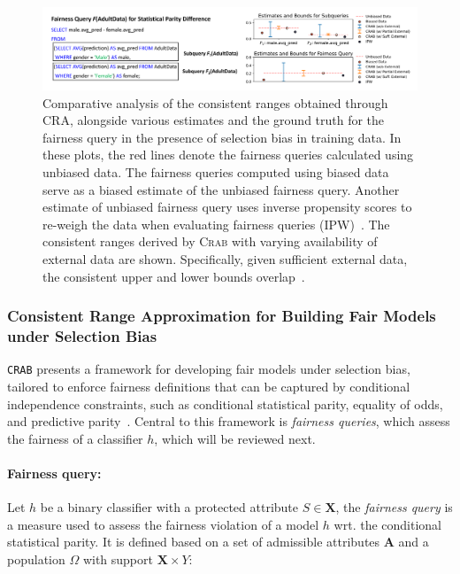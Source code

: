 \documentclass[11pt]{article}
\newcommand{\classifier}{\ensuremath{h}}
\newcommand{\ProtectedAttr}{S}
\newcommand{\Admis}{\boldsymbol{A}}
\newcommand{\crab}{\textsc{Crab}\xspace}
\newcommand{\ipw}{IPW\xspace}
\begin{document}
\begin{figure}[t]
    \centering
    \includegraphics[width=\linewidth]{submissions/submission5/figs/bound_comp.pdf}
    \vspace{-8mm}
    \caption{
    Comparative analysis of the consistent ranges obtained through CRA, alongside various estimates and the ground truth for the fairness query in the presence of selection bias in training data. In these plots, the red lines denote the fairness queries calculated using unbiased data. The fairness queries computed using biased data serve as a biased estimate of the unbiased fairness query. Another estimate of unbiased fairness query uses inverse propensity scores to re-weigh the data when evaluating fairness queries (\ipw)~\cite{cortes2008sample}. The consistent ranges derived by \crab with varying availability of external data are shown. Specifically, given sufficient external data, the consistent upper and lower bounds overlap~\cite{zhu2023consistent}.}
    \label{fig:boundcomp}
\end{figure}

\vspace{-.3cm}
\subsubsection{Consistent Range Approximation for Building Fair Models under Selection Bias}
\texttt{CRAB} presents a framework for developing fair models under selection bias, tailored to enforce fairness definitions that can be captured by conditional independence constraints, such as conditional statistical parity, equality of odds, and predictive parity~\cite{zafar2017fairness}. Central to this framework is \emph{fairness queries}, which assess the fairness of a classifier $h$, which will be reviewed next.
\vspace{-.3cm}
\paragraph{Fairness query:}
Let $\classifier$ be a binary classifier with a protected attribute $\ProtectedAttr \in \boldsymbol{X}$, the \emph{fairness query} is a measure used to assess the fairness violation of a model $h$ wrt. the conditional statistical parity. It is defined based on a set of admissible attributes $\Admis$ and a population $\Omega$ with support $\boldsymbol{X} \times Y$:
\end{document}
